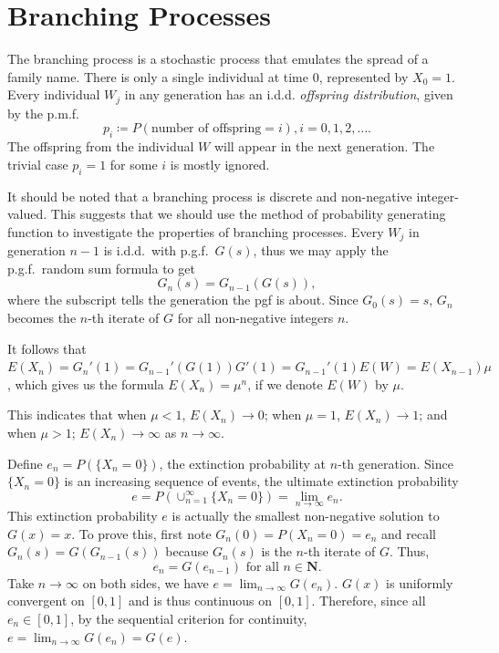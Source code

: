 \documentclass[11pt]{article}
\newcommand{\N}{\mathbf{N}}
\begin{document}


\section{Branching Processes}

The branching process is a stochastic process that emulates the spread of a family name. There is only a single individual at time 0, represented by $X_{0}=1$. Every individual $W_{j}$ in any generation has an i.d.d. \textit{offspring distribution}, given by the p.m.f.
\[
p_{i}\coloneqq P(\text{number of offspring}=i),i=0,1,2,\dots .
\]
The offspring from the individual $W$ will appear in the next generation. The trivial case 
$p_{i}=1$ for some $i$ is mostly ignored.

It should be noted that a branching process is discrete and non-negative integer-valued. This suggests that we should use the method of probability generating function to investigate the properties of branching processes. Every $W_{j}$ in generation $n- 1$ is i.d.d.\ with p.g.f.\ $G(s)$, thus we may apply the p.g.f.\ random sum formula to get
\[
G_{n}(s)=G_{n-1}(G(s)),
\]
where the subscript tells the generation the pgf is about. Since $G_{0}(s)=s$, $G_{n}$ becomes the $n$-th iterate of $G$ for all non-negative integers $n$.

It follows that $E(X_{n})=G_{n}'(1)=G_{n- 1}'(G(1))G'(1)=G_{n- 1}'(1)E(W)=E(X_{n- 1})\mu $, which gives us the formula $E(X_{n})=\mu ^{n}$, if we denote $E(W)$ by $\mu $.

This indicates that when $\mu <1$, $E(X_{n})\rightarrow 0$; when $\mu =1$, $E(X_{n})\rightarrow 1$; and when $\mu >1$; $E(X_{n})\rightarrow \infty $ as $n\rightarrow \infty $.

Define $e_{n}=P(\{X_{n}=0\})$, the extinction probability at $n$-th generation. Since $\{X_{n}=0\}$ is an increasing sequence of events, the ultimate extinction probability
\[
e=P(\cup _{n=1}^{\infty }\{X_{n}=0\})=\lim _{n \to \infty }e_{n}.
\]
This extinction probability $e$ is actually the smallest non-negative solution to $G(x)=x$. To prove this, first note $G_{n}(0)=P(X_{n}=0)=e_{n}$ and recall $G_{n}(s)=G(G_{n- 1}(s))$ because $G_{n}(s)$ is the $n$-th iterate of $G$. Thus,
\[
e_{n}=G(e_{n- 1}) \text{ for all } n\in \N .
\]
Take $n\rightarrow \infty $ on both sides, we have $e=\lim _{n\rightarrow \infty }G(e_{n})$. $G(x)$ is uniformly convergent on 
$[0,1]$ and is thus continuous on $[0,1]$. Therefore, since all $e_{n}\in [0,1]$, by the sequential criterion for continuity, $e=\lim _{n\rightarrow \infty }G(e_{n})=G(e)$.
\end{document}
